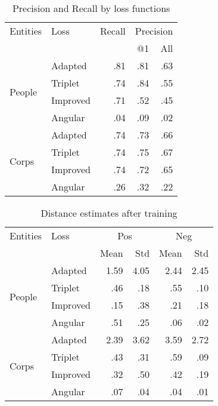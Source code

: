 \begin{table}[ht]
\caption{Precision and Recall by loss functions}
\label{precision_recall}
\begin{center}
\begin{tabular}{|l|l|r|r|r|}
\hline
Entities & Loss & Recall & \multicolumn{2}{|c|}{Precision} \\
 & & & @1 & All \\
\hline
\multirow{4}{*}{People} & Adapted & .81 & .81 & .63 \\
\cline{2-5}
& Triplet & .74 & .84 & .55 \\
\cline{2-5}
& Improved & .71 & .52 & .45 \\
\cline{2-5}
& Angular & .04 & .09 & .02 \\
\hline
\multirow{4}{*}{Corps} & Adapted & .74 & .73 & .66 \\
\cline{2-5}
& Triplet & .74 & .75 & .67 \\
\cline{2-5}
& Improved & .74 & .72 & .65 \\
\cline{2-5}
& Angular & .26 & .32 & .22 \\
\hline
\end{tabular} %
\end{center}
\end{table}


\begin{table}[ht]
\caption{Distance estimates after training}
\label{distance}
\begin{center}
\begin{tabular}{|l|l|r|r|r|r|}
\hline
Entities & Loss & \multicolumn{2}{|c|}{Pos} & \multicolumn{2}{|c|}{Neg} \\
& & Mean & Std & Mean & Std \\
\hline
\multirow{4}{*}{People} & Adapted & 1.59 & 4.05 & 2.44 & 2.45 \\
\cline{2-6}
& Triplet & .46 & .18 & .55 & .10 \\
\cline{2-6}
& Improved & .15 & .38 & .21 & .18 \\
\cline{2-6}
& Angular & .51 & .25 & .06 & .02 \\
\hline
\multirow{4}{*}{Corps} & Adapted & 2.39 & 3.62 & 3.59 & 2.72 \\
\cline{2-6}
& Triplet & .43 & .31 & .59 & .09 \\
\cline{2-6}
& Improved & .32 & .50 & .42 & .19 \\
\cline{2-6}
& Angular & .07 & .04 & .04 & .01 \\
\hline
\end{tabular}%
\end{center}
\end{table}


